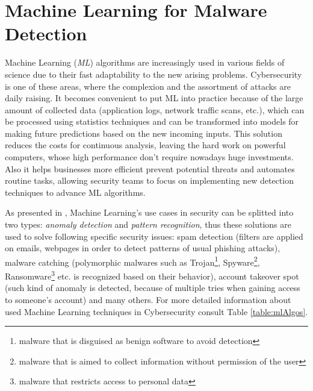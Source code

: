 \section{Machine Learning for Malware Detection}
\label{section:mlForMalware}
Machine Learning (\textit{ML}) algorithms are increasingly used in various fields of science due to their fast adaptability to the new arising problems. Cybersecurity is one of these areas, where the complexion and the assortment of attacks are daily raising. It becomes convenient to put ML into practice because of the large amount of collected data (application logs, network traffic scans, etc.), which can be processed using statistics techniques and can be transformed into models for making future predictions based on the new incoming inputs. This solution reduces the costs for continuous analysis, leaving the hard work on powerful computers, whose high performance don't require nowadays huge investments. Also it helps businesses more efficient prevent potential threats and automates routine tasks, allowing security teams to focus on implementing new detection techniques to advance ML algorithms. \par 
As presented in \cite{mlsec}, Machine Learning's use cases in security can be splitted into two types: \textit{anomaly detection} and \textit{pattern recognition}, thus these solutions are used to solve following specific security issues: spam detection (filters are applied on emails, webpages in order to detect patterns of usual phishing attacks), malware catching (polymorphic malwares such as Trojan\footnote{malware that is disguised as benign software to avoid detection}, Spyware\footnote{malware that is aimed to collect information without permission of the user}, Ransomware\footnote{malware that restricts access to personal data} etc. is recognized based on their behavior), account takeover spot (such kind of anomaly is detected, because of multiple tries when gaining access to someone's account) and many others. For more detailed information about used Machine Learning techniques in Cybersecurity consult Table \ref{table:mlAlgos}.

